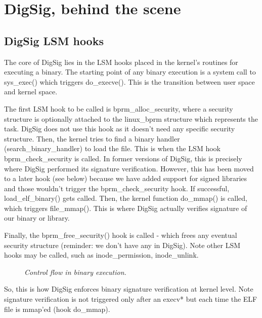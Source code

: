 \documentclass{article}
\begin{document}
\section{DigSig, behind the scene}

\subsection{DigSig LSM hooks}

The core of DigSig lies in the LSM hooks placed in the kernel's
routines for executing a binary. The starting point of any binary
execution is a system call to sys\_exec() which triggers
do\_execve(). This is the transition between user space and kernel
space.

The first LSM hook to be called is bprm\_alloc\_security,
where a security structure is optionally attached to the
linux\_bprm structure which represents the task. DigSig
does not use this hook as it doesn't need any specific
security structure.
Then, the kernel tries to find a binary handler 
(search\_binary\_handler) to load the file. This is
when the LSM hook bprm\_check\_security is called. 
In former versions of DigSig, this is precisely where DigSig
performed its signature verification. However, this has been
moved to a later hook (see below) because we have added
support for signed libraries and those wouldn't trigger
the bprm\_check\_security hook.
If successful, load\_elf\_binary() gets called. Then,
the kernel function do\_mmap() is called, which triggers
file\_mmap(). This is where DigSig actually verifies signature
of our binary or library.

Finally, the bprm\_free\_security() hook is called - which
frees any eventual security structure (reminder: we don't have
any in DigSig). Note other LSM hooks may be called, such as 
inode\_permission, inode\_unlink.


\begin{figure}[htb]
\begin{center}
\epsfxsize=12cm 
\caption{{\it Control flow in binary execution. }}
\label{fig1}
\end{center}
\end{figure}

So, this is how DigSig enforces binary signature verification at
kernel level. Note signature verification is not triggered only after an execv* but each time the ELF file is mmap'ed (hook do\_mmap).
\end{document}
